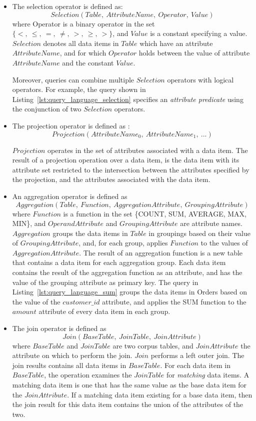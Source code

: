 \begin{itemize}
  \item The selection operator is defined as:
  \[
  Selection(Table,~AttributeName,~Operator,~Value)
  \]
  where Operator is a binary operator in the set $\{<,~\leq,~=,~\neq,~>,~\geq,~>\}$,
  and $Value$ is a constant specifying a value.
  $Selection$ denotes all data items in $Table$ which
  have an attribute $AttributeName$,
  and for which $Operator$ holds between the value of attribute $AttributeName$ and the constant $Value$.

  Moreover, queries can combine multiple $Selection$ operators with logical operators.
  For example, the query shown in Listing~\ref{lst:query_language_selection}
  specifies an \textit{attribute predicate} using the conjunction of two $Selection$ operators.

  \item The projection operator is defined as :
  \[
  Projection(AttributeName_0,~AttributeName_1,~...)
  \]

  $Projection$ operates in the set of attributes associated with a data item.
  The result of a projection operation over a data item, is the data item with its attribute set restricted to the
  intersection between the attributes specified by the projection, and the attributes associated with the data item.

  \item An aggregation operator is defined as
  \[
  Aggregation(Table,~Function,~AggregationAttribute,~GroupingAttribute)
  \]
  where $Function$ is a function in the set \{COUNT, SUM, AVERAGE, MAX, MIN\},
  and $OperandAttribute$ and $GroupingAttribute$ are attribute names.
  $Aggregation$ groups the data items in $Table$ in groupings based on their value of $GroupingAttribute$,
  and, for each group, applies $Function$ to the values of $AggregationAttribute$.
  The result of an aggregation function is a new table that contains a data item for each aggregation group.
  Each data item contains the result of the aggregation function as an attribute, and has the value of the grouping attribute as primary key.
  The query in Listing~\ref{lst:query_language_sum}
  groups the data items in Orders based on the value of the $customer\_id$ attribute,
  and applies the SUM function to the $amount$ attribute of every data item in each group.

  \item The join operator is defined as
  \[
  Join(BaseTable,~JoinTable,~JoinAttribute)
  \]
  where $BaseTable$ and $JoinTable$ are two corpus tables, and $JoinAttribute$ the attribute on which to perform the join.
  $Join$ performs a left outer join.
  The join results contains all data items in $BaseTable$.
  For each data item in $BaseTable$, the operation examines the $JoinTable$ for \textit{matching} data items.
  A matching data item is one that has the same value as the base data item for the $JoinAttribute$.
  If a matching data item existing for a base data item, then the join result for this data item contains the union of the attributes of the two.


\end{itemize}
